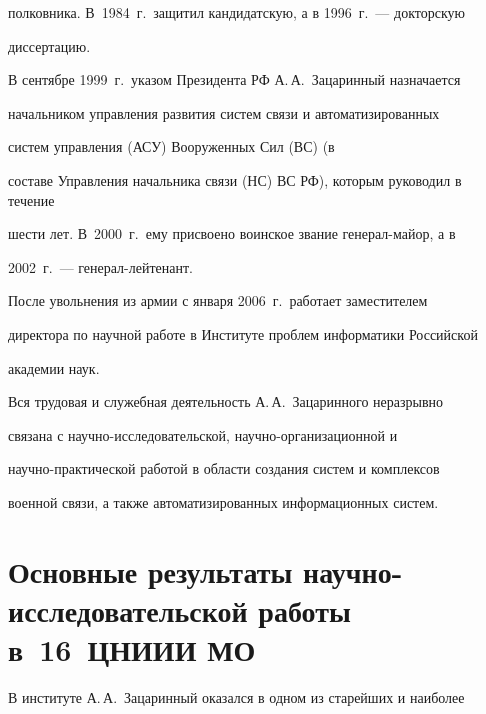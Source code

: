 полковника. В~1984~г.\ защитил кандидатскую, а в 1996~г.~--- докторскую 


диссертацию.





В сентябре 1999~г.\ указом Президента РФ А.\,А.~Зацаринный назначается 


начальником управления развития сис\-тем связи и автоматизированных


сис\-тем управ\-ле\-ния (АСУ) Вооруженных Сил (ВС) (в 


составе Управления начальника связи (НС) ВС РФ), которым руководил в течение 


шести лет. В~2000~г.\ ему присвоено воинское звание ге\-не\-рал-май\-ор, а в 


2002~г.~--- генерал-лейтенант.





После увольнения из армии с января 2006~г.\ работает за\-мес\-ти\-те\-лем 


директора по научной работе в Институте проблем информатики Российской 


академии наук.





Вся трудовая и служебная деятельность А.\,А.~Зацаринного неразрывно 


связана с научно-исследовательской, научно-организационной и 


научно-практической работой в области создания сис\-тем и комплексов 


военной связи, а также автоматизированных информационных систем.





\vspace*{-6pt}





\section{Основные результаты научно-исследовательской работы в~16~ЦНИИИ МО}





\vspace*{-3pt}





В институте А.\,А.~За\-ца\-рин\-ный оказался в одном из старейших и наиболее 


